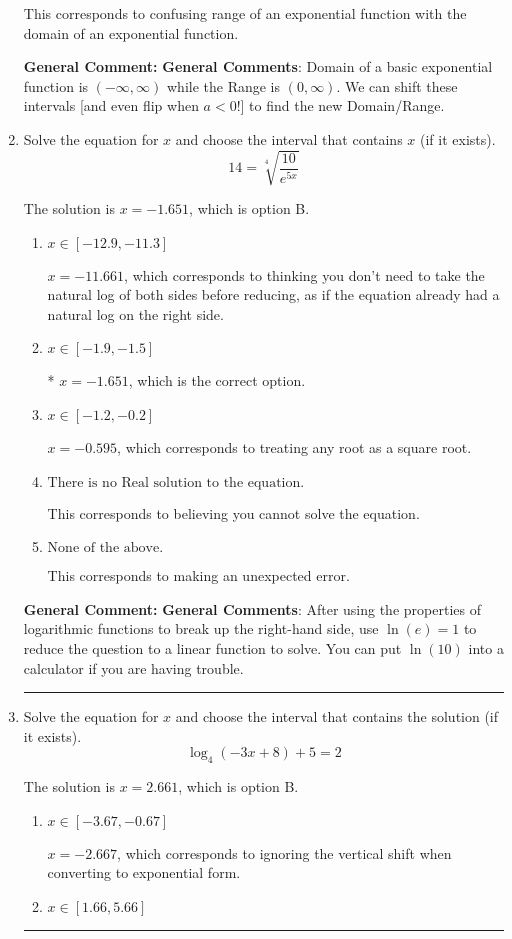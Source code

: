 \documentclass{extbook}[14pt]
\newcommand{\litem}[1]{\item #1

\rule{\textwidth}{0.4pt}}
\begin{document}
\begin{enumerate}
{\begin{enumerate}[label=\Alph*.]
This corresponds to confusing range of an exponential function with the domain of an exponential function.
\end{enumerate}

\textbf{General Comment:} \textbf{General Comments}: Domain of a basic exponential function is $(-\infty, \infty)$ while the Range is $(0, \infty)$. We can shift these intervals [and even flip when $a<0$!] to find the new Domain/Range.
}
\litem{
 Solve the equation for $x$ and choose the interval that contains $x$ (if it exists).
\[  14 = \sqrt[4]{\frac{10}{e^{5x}}} \]

The solution is \( x = -1.651 \), which is option B.\begin{enumerate}[label=\Alph*.]
\item \( x \in [-12.9, -11.3] \)

$x = -11.661$, which corresponds to thinking you don't need to take the natural log of both sides before reducing, as if the equation already had a natural log on the right side.
\item \( x \in [-1.9, -1.5] \)

* $x = -1.651$, which is the correct option.
\item \( x \in [-1.2, -0.2] \)

$x = -0.595$, which corresponds to treating any root as a square root.
\item \( \text{There is no Real solution to the equation.} \)

This corresponds to believing you cannot solve the equation.
\item \( \text{None of the above.} \)

This corresponds to making an unexpected error.
\end{enumerate}

\textbf{General Comment:} \textbf{General Comments}: After using the properties of logarithmic functions to break up the right-hand side, use $\ln(e) = 1$ to reduce the question to a linear function to solve. You can put $\ln(10)$ into a calculator if you are having trouble.
}
\litem{
Solve the equation for $x$ and choose the interval that contains the solution (if it exists).
\[ \log_{4}{(-3x+8)}+5 = 2 \]

The solution is \( x = 2.661 \), which is option B.\begin{enumerate}[label=\Alph*.]
\item \( x \in [-3.67, -0.67] \)

$x = -2.667$, which corresponds to ignoring the vertical shift when converting to exponential form.
\item \( x \in [1.66, 5.66] \)


\end{enumerate}}
\end{enumerate}
\end{document}
